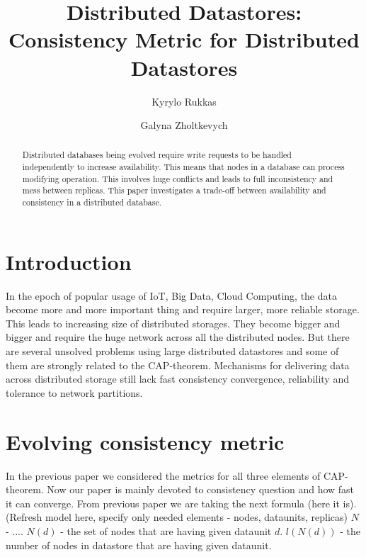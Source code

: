 \documentclass{llncs}
\begin{document}
\title{Distributed Datastores: Consistency Metric for Distributed Datastores}
\author{Kyrylo Rukkas\and Galyna Zholtkevych}
\maketitle
\begin{abstract}
Distributed databases being evolved require write requests to be handled independently to increase availability.
This means that nodes in a database can process modifying operation. This involves huge conflicts and leads to
full inconsistency and mess between replicas. This paper investigates a trade-off between availability and consistency
in a distributed database.
\end{abstract}

\section{Introduction}\label{sec:intro}
In the epoch of popular usage of IoT, Big Data, Cloud Computing, the data become more and more 
important thing and require larger, more reliable storage. This leads to increasing size of distributed
storages. They become bigger and bigger and require the huge network across all the distributed nodes.
But there are several unsolved problems using large distributed datastores and some of them are strongly related
to the CAP-theorem. Mechanisms for delivering data across distributed storage still lack fast consistency convergence, reliability and tolerance to network partitions.

\section{Evolving consistency metric}

In the previous paper we considered the metrics for all three elements of CAP-theorem.
Now our paper is mainly devoted to consistency question and how fast it can converge.
From previous paper we are taking the next formula (here it is).
(Refresh model here, specify only needed elements - nodes, dataunits, replicas)
$N$ - ....
$N(d)$ - the set of nodes that are having given dataunit $d$.
$l(N(d))$ - the number of nodes in datastore that are having given dataunit.
\end{document}

